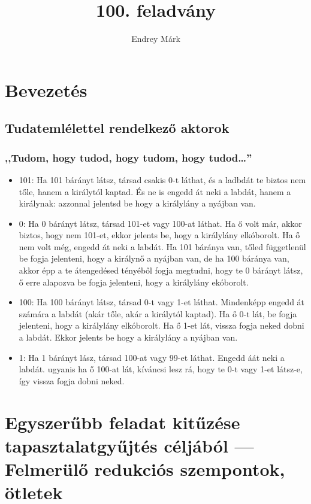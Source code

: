 \documentclass{article}
\title{100. feladvány}
\author{Endrey Márk}
\begin{document}
	\maketitle

	\tableofcontents

	\section{Bevezetés}

	\subsection{Tudatemlélettel rendelkező aktorok}

	\subsubsection{,,Tudom, hogy tudod, hogy tudom, hogy tudod\dots''}

	\begin{itemize}
		\item 101: Ha 101 bárányt látsz, társad csakis 0-t láthat, és a ladbdát te biztos nem tőle, hanem a királytól kaptad. És ne is engedd át neki a labdát, hanem a királynak: azzonnal jelentsd be hogy a királylány a nyájban van.
		\item 0: Ha   0 bárányt látsz, társad 101-et vagy 100-at láthat. Ha ő volt már, akkor biztos, hogy nem 101-et, ekkor jelents be, hogy a királylány elkóborolt. Ha ő nem volt még, engedd át neki a labdát. Ha 101 báránya van, tőled függetlenül be fogja jelenteni, hogy a királynő a nyájban van, de ha 100 báránya van, akkor  épp a te átengedésed tényéből fogja megtudni, hogy te 0 bárányt látsz, ő erre alapozva be fogja jelenteni, hogy a királylány ekóborolt.
		\item 100: Ha 100 bárányt látsz, társad 0-t vagy 1-et láthat. Mindenképp engedd át számára a labdát (akár tőle, akár a királytól kaptad). Ha ő 0-t lát, be fogja jelenteni, hogy a királylány elkóborolt. Ha ő 1-et lát, vissza fogja neked dobni a labdát. Ekkor jelents be hogy a királylány a nyájban van.
		\item 1: Ha 1 bárányt lász, társad 100-at vagy 99-et láthat. Engedd áát neki a labdát. ugyanis ha ő 100-at lát, kíváncsi lesz rá, hogy te 0-t vagy 1-et látsz-e, így vissza fogja dobni neked.
	\end{itemize}

	\section{Egyszerűbb feladat kitűzése tapasztalatgyűjtés céljából --- Felmerülő redukciós szempontok, ötletek}
\end{document}
